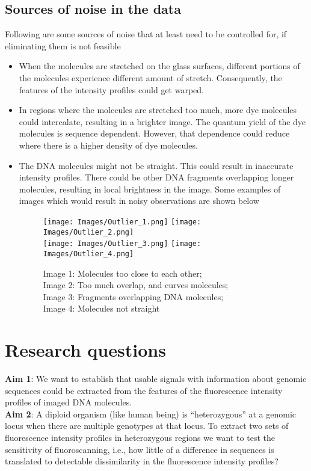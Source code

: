 \subsection{Sources of noise in the data} \label{sec_noise}
Following are some sources of noise that at least need to be controlled for, if eliminating them is not feasible
\begin{itemize}
\item When the molecules are stretched on the glass surfaces, different portions of the molecules experience different amount of stretch. Consequently, the features of the intensity profiles could get warped. 
\item In regions where the molecules are stretched too much, more dye molecules could intercalate, resulting in a brighter image. The quantum yield of the dye molecules is sequence dependent. However, that dependence could reduce where there is a higher density of dye molecules. 
\item The DNA molecules might not be straight. This could result in inaccurate intensity profiles. There could be other DNA fragments overlapping longer molecules, resulting in local brightness in the image. Some examples of images which would result in noisy observations are shown below
\begin{figure}[H]
\begin{center}
\texttt{[image: Images/Outlier\_1.png]}
\texttt{[image: Images/Outlier\_2.png]} \\
\texttt{[image: Images/Outlier\_3.png]}
\texttt{[image: Images/Outlier\_4.png]}
\end{center}
\caption{Image 1: Molecules too close to each other; \\ Image 2: Too much overlap, and curves molecules; \\Image 3: Fragments overlapping DNA molecules; \\Image 4: Molecules not straight}
\label{fig:Fig2_OutlierImages}
\end{figure}

\end{itemize}

\section{Research questions}
\noindent
{\bf{Aim 1}}: We want to establish that usable signals with information about genomic sequences could be extracted from the features of the fluorescence intensity profiles of imaged DNA molecules. \\
\noindent
{\bf{Aim 2}}: A diploid organism (like human being) is ``heterozygous'' at a genomic locus when there are multiple genotypes at that locus. To extract two sets of fluorescence intensity profiles in heterozygous regions we want to test the sensitivity of fluoroscanning, i.e., how little of a difference in sequences is translated to detectable dissimilarity in the fluorescence intensity profiles?

